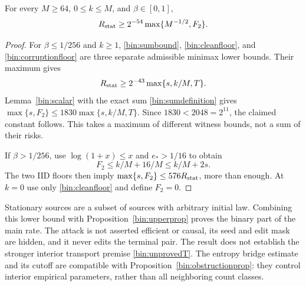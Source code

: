 \begin{proposition}
\label{bin:lowerprop}
For every $M\ge64$, $0\le k\le M$, and $\beta\in[0,1]$,
\[
 R_{\rm stat}\ge2^{-54}\max\{M^{-1/2},F_2\}.
\]
\end{proposition}
\begin{proof}
For $\beta\le1/256$ and $k\ge1$, \eqref{bin:sumbound}, \eqref{bin:cleanfloor}, and \eqref{bin:corruptionfloor} are three separate admissible minimax lower bounds. Their maximum gives
\[
 R_{\rm stat}\ge2^{-43}\max\{s,k/M,T\}.
\]
Lemma~\ref{bin:scalar} with the exact sum \eqref{bin:sumdefinition} gives
$\max\{s,F_2\}\le1830\max\{s,k/M,T\}$. Since $1830<2048=2^{11}$, the claimed constant follows. This takes a maximum of different witness bounds, not a sum of their risks.

If $\beta>1/256$, use $\log(1+x)\le x$ and $e_*>1/16$ to obtain
\[
 F_2\le k/M+16/M\le k/M+2s.
\]
The two IID floors then imply $\max\{s,F_2\}\le576R_{\rm stat}$, more than enough. At $k=0$ use only \eqref{bin:cleanfloor} and define $F_2=0$.
\end{proof}

Stationary sources are a subset of sources with arbitrary initial law. Combining this lower bound with Proposition~\ref{bin:upperprop} proves the binary part of the main rate. The attack is not asserted efficient or causal, its seed and edit mask are hidden, and it never edits the terminal pair. The result does not establish the stronger interior transport premise \eqref{bin:unprovedT}. The entropy bridge estimate and its cutoff are compatible with Proposition~\ref{bin:obstructionprop}: they control interior empirical parameters, rather than all neighboring count classes.
